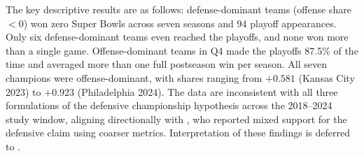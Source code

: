 The key descriptive results are as follows: defense-dominant teams (offense
share $< 0$) won zero Super Bowls across seven seasons and 94 playoff
appearances. Only six defense-dominant teams even reached the playoffs, and
none won more than a single game. Offense-dominant teams in Q4 made the
playoffs 87.5\% of the time and averaged more than one full postseason win per
season. All seven champions were offense-dominant, with shares ranging from
$+0.581$ (Kansas City 2023) to $+0.923$ (Philadelphia 2024). The data are
inconsistent with all three formulations of the defensive championship
hypothesis across the 2018--2024 study window, aligning directionally with
\textcite{robst2011defense}, who reported mixed support for the defensive
claim using coarser metrics. Interpretation of these findings is deferred to
.
